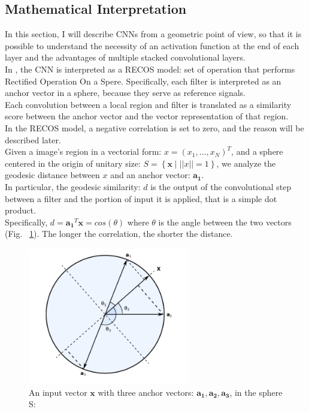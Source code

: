 \documentclass[LaM,binding=0.6cm]{sapthesis}
\begin{document}
\subsection{Mathematical Interpretation}
In this section, I will describe CNNs from a geometric point of view, so that it is possible to understand the necessity of an activation function at the end of each layer and the advantages of multiple stacked convolutional layers.\\In \cite{cnninter}, the CNN is interpreted as a RECOS model: set of operation that performs Rectified Operation On a Spere. Specifically, each filter is interpreted as an anchor vector in a sphere, because they serve as reference signals.\\Each convolution between a local region and filter is translated as a similarity score between the anchor vector and the vector representation of that region.\\In the RECOS model, a negative correlation is set to zero, and the reason will be described later.\\Given a image's region in a vectorial form: $x=(x_1,\dots,x_N)^T$, and a sphere centered in the origin of unitary size: $S=\left\{\boldsymbol{x}\mid ||x||=1\right\}$, we analyze the geodesic distance between $x$ and an anchor vector: $\boldsymbol{a_1}$.\\In particular, the geodesic similarity: $d$ is the output of the convolutional step between a filter and the portion of input it is applied, that is a simple dot product.\\Specifically, $d=\boldsymbol{a_1}^T \boldsymbol{x}=cos(\theta)$ where $\theta$ is the angle between the two vectors (Fig. ~\ref{fig:geocnn}). The longer the correlation, the shorter the distance.
\begin{figure}[H]  \centering
    \includegraphics[width=70mm,scale=0.7]{geocnn}
    \caption{An input vector $\boldsymbol{x}$ with three anchor vectors: $\boldsymbol{a_1,a_2,a_3}$, in the sphere S: \cite{cnninter}}
    \label{fig:geocnn}
\end{figure}
\end{document}
